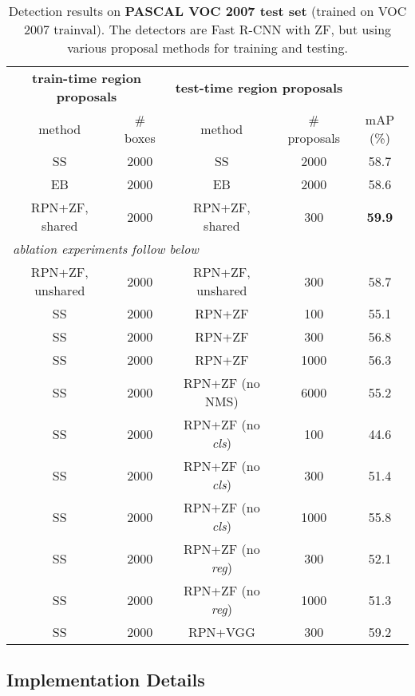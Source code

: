 \documentclass[10pt,journal,cspaper,compsoc]{IEEEtran}
\begin{document}
\setlength{\tabcolsep}{8pt}
\renewcommand{\arraystretch}{1.1}
\begin{table*}[t]
\begin{center}
\caption{Detection results on \textbf{PASCAL VOC 2007 test set} (trained on VOC 2007 trainval). The detectors are Fast R-CNN with ZF, but using various proposal methods for training and testing.}
\vspace{-1em}
\small
\begin{tabular}{cc|cc|c}
  \multicolumn{2}{c|}{\bf train-time region proposals} & \multicolumn{2}{c|}{\bf test-time region proposals} &   \\
  method & \# boxes & method & \# proposals &  mAP (\%) \\
  \hline\hline
  SS & 2000 & SS & 2000 & 58.7 \\
  EB & 2000 & EB & 2000 & 58.6 \\
  RPN+ZF, shared & 2000 & RPN+ZF, shared & 300 & \textbf{59.9} \\
  \hline
  \hline
  \multicolumn{5}{l}{\emph{ablation experiments follow below}} \\
  \hline
  \hline
  RPN+ZF, unshared & 2000 & RPN+ZF, unshared & 300 & 58.7 \\
  \hline
  SS & 2000 & RPN+ZF & 100 & 55.1 \\
  SS & 2000 & RPN+ZF & 300 & 56.8 \\
  SS & 2000 & RPN+ZF & 1000 & 56.3 \\
  SS & 2000 & RPN+ZF (no NMS) & 6000 & 55.2 \\
  \hline
  SS & 2000 & RPN+ZF (no \emph{cls}) & 100 & 44.6 \\
  SS & 2000 & RPN+ZF (no \emph{cls}) & 300 & 51.4 \\
  SS & 2000 & RPN+ZF (no \emph{cls}) & 1000 & 55.8 \\
  \hline
  SS & 2000 & RPN+ZF (no \emph{reg}) & 300 & 52.1 \\
  SS & 2000 & RPN+ZF (no \emph{reg}) & 1000 & 51.3 \\
  \hline
  SS & 2000 & RPN+VGG & 300 & 59.2 \\
\end{tabular}
\label{tab:results}
\end{center}
\end{table*}

\subsection{Implementation Details}
\end{document}
